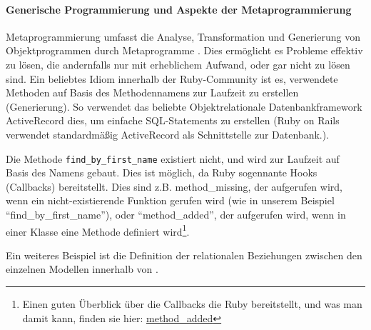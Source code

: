 \paragraph{Generische Programmierung und Aspekte der Metaprogrammierung}
Metaprogrammierung umfasst die Analyse, Transformation und Generierung von Objektprogrammen durch Metaprogramme \citep{herrmann_2005}.  Dies ermöglicht es Probleme effektiv zu lösen, die andernfalls nur mit erheblichem Aufwand, oder gar nicht zu lösen sind.
Ein beliebtes Idiom innerhalb der Ruby-Community ist es, verwendete Methoden auf Basis des Methodennamens zur Laufzeit zu erstellen (Generierung). So verwendet das beliebte Objektrelationale Datenbankframework ActiveRecord dies, um einfache SQL-Statements zu erstellen (Ruby on Rails verwendet standardmäßig ActiveRecord als Schnittstelle zur Datenbank.).
\begin{ruby}[label=IRB]
\end{ruby}


Die Methode \texttt{find\_by\_first\_name} existiert nicht, und wird zur Laufzeit auf Basis des Namens gebaut. Dies ist möglich, da Ruby sogennante Hooks (Callbacks) bereitstellt. Dies sind z.B. method\_missing, der aufgerufen wird, wenn ein nicht-existierende Funktion gerufen wird (wie in unserem Beispiel "`find\_by\_first\_name"'), oder "`method\_added"', der aufgerufen wird, wenn in einer Klasse eine Methode definiert wird\footnote{Einen guten Überblick über die Callbacks die Ruby bereitstellt, und was man damit kann, finden sie hier: \url{method_added}}.

Ein weiteres Beispiel ist die Definition der relationalen Beziehungen zwischen den einzelnen Modellen innerhalb von .
\begin{ruby}[label=app/models/job.rb]
   
   
\end{ruby}

